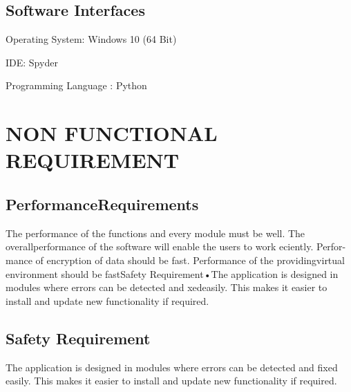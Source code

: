 \documentclass[oneside,a4paper,12pt]{report}
\begin{document}
 \subsection {Software Interfaces}
\item  Operating System: Windows 10 (64 Bit)\\
\item IDE: Spyder\\
\item Programming Language : Python\\

\section {NON FUNCTIONAL REQUIREMENT}
\subsection {PerformanceRequirements}
\item The performance of the functions and every module must be well. The overallperformance of the software will enable the users to work eciently.  Perfor-mance  of  encryption  of  data  should  be  fast.   Performance  of  the  providingvirtual environment should be fastSafety Requirement•The application is designed in modules where errors can be detected and xedeasily. This makes it easier to install and update new functionality if required.\\
 \subsection {Safety Requirement}
 \item The application is designed in modules where errors can be detected and fixed easily. This makes it easier to install and update new functionality if required.\\
 
\end{document}
